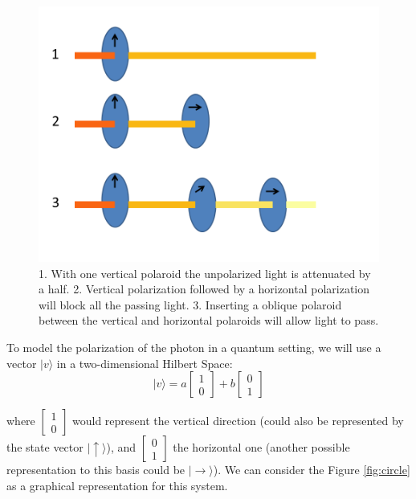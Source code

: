 \begin{figure}[h]
\centering 

\includegraphics[scale=0.25]{Figures/Polaroids.png}
\caption{1. With one vertical polaroid the unpolarized light is attenuated by a half. 2. Vertical polarization followed by a horizontal polarization will block all the passing light. 3. Inserting a oblique polaroid between the vertical and horizontal polaroids will allow light to pass.}
\label{fig:polaroids}
\end{figure}

To model the polarization of the photon in a quantum setting, we will use a vector $\vert v \rangle $ in a two-dimensional Hilbert Space: 
\begin{equation}
\vert v \rangle = a\left[\begin{array}{c}
1\\
0
\end{array}\right]+ b\left[\begin{array}{c}
0\\
1
\end{array}\right]
\end{equation}

where $\left[\begin{array}{c}
1\\
0
\end{array}\right]$ would represent the vertical direction (could also be represented by the state vector $\vert\uparrow\rangle$), and $\left[\begin{array}{c}
0\\
1
\end{array}\right] $ the horizontal one (another possible representation to this basis could be $\vert\rightarrow\rangle$). We can consider the Figure \ref{fig:circle} as a graphical representation for this system.

